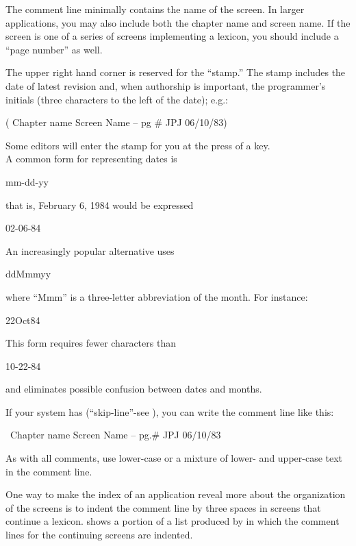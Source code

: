 The comment line minimally contains the name of the screen.  In larger
applications, you may also include both the chapter name and screen
name.  If the screen is one of a series of screens implementing a
lexicon, you should include a ``page number'' as well.

The upper right hand corner is reserved for the ``stamp.'' The stamp
includes the date of latest revision and, when authorship is
important, the programmer's initials (three characters to the left of
the date); e.g.:
\begin{Code}
( Chapter name          Screen Name -- pg #        JPJ 06/10/83)
\end{Code}
Some \Forth{} editors will enter the stamp for you at the press of a key.\\
A common form for representing dates is
\begin{Code}
mm-dd-yy
\end{Code}
that is, February 6, 1984 would be expressed
\begin{Code}
02-06-84
\end{Code}
An increasingly popular alternative uses
\begin{Code}
ddMmmyy
\end{Code}
where ``Mmm'' is a three-letter abbreviation of the month.  For instance:
\begin{Code}
22Oct84
\end{Code}
This form requires fewer characters than
\begin{Code}
10-22-84
\end{Code}
and eliminates possible confusion between dates and months.

If your system has \forth{\bs} (``skip-line''-see ), you can
write the comment line like this:
\begin{Code}
\ Chapter name          Screen Name -- pg.#         JPJ 06/10/83
\end{Code}
As with all comments, use lower-case or a mixture of lower- and
upper-case text in the comment line.

One way to make the index of an application reveal more about the
organization of the screens is to indent the comment line by three
spaces in screens that continue a lexicon.   shows a
portion of a list produced by  in which the comment lines
for the continuing screens are indented.

